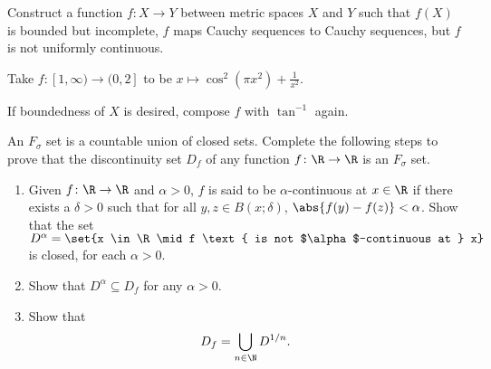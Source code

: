 \documentclass[12pt]{article}
\begin{document}
\begin{exercise*}
    Construct a function $f\colon X \to Y$ between metric spaces $X$ and $Y$
    such that $f(X)$ is bounded but incomplete,
    $f$ maps Cauchy sequences to Cauchy sequences,
    but $f$ is not uniformly continuous.
\end{exercise*}
\begin{solution}
    Take $f\colon [1, \infty) \to (0, 2]$ to be
    $x \mapsto \cos^2(\pi x^2) + \frac1{x^2}$.

    If boundedness of $X$ is desired, compose $f$ with $\tan^{-1}$ again.
\end{solution}

\begin{problem*}
    An $F_\sigma$ set is a countable union of closed sets.
    Complete the following steps to prove that the discontinuity set $D_f$
    of any function $f\colon \R \to \R$ is an $F_\sigma$ set.
    \begin{enumerate}[label=(\alph*)]
        \item Given $f\colon \R \to \R$ and $\alpha > 0$,
        $f$ is said to be $\alpha$-continuous at $x \in \R$
        if there exists a $\delta > 0$ such that for all
        $y, z \in B(x; \delta)$, $\abs{f(y) - f(z)} < \alpha$.
        Show that the set $D^\alpha = \set{x \in \R \mid f \text{ is not
        $\alpha$-continuous at } x}$ is closed, for each $\alpha > 0$.
        \item Show that $D^\alpha \subseteq D_f$ for any $\alpha > 0$.
        \item Show that \[
                D_f = \bigcup_{n \in \N} D^{1/n}.
            \]
    \end{enumerate}
\end{problem*}
\end{document}
